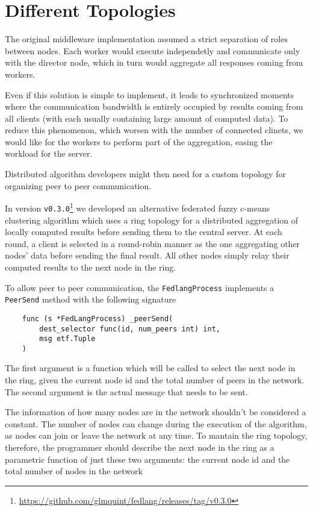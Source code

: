 \chapter{Different Topologies}

The original middleware implementation assumed a strict separation of roles between nodes. Each worker would execute independetly and communicate only with the director node, which in turn would aggregate all responses coming from workers.

Even if this solution is simple to implement, it leads to synchronized moments where the communication bandwidth is entirely occupied by results coming from all clients (with each usually containing large amount of computed data). To reduce this phenomenon, which worsen with the number of connected clinets, we would like for the workers to perform part of the aggregation, easing the workload for the server. 

Distributed algorithm developers might then need for a custom topology for organizing peer to peer communication.

In version \texttt{v0.3.0}\footnote{\url{https://github.com/glmquint/fedlang/releases/tag/v0.3.0}} we developed an alternative federated fuzzy c-means clustering algorithm which uses a ring topology for a distributed aggregation of locally computed results before sending them to the central server. At each round, a client is selected in a round-robin manner as the one aggregating other nodes' data before sending the final result. All other nodes simply relay their computed results to the next node in the ring.

To allow peer to peer communication, the \texttt{FedlangProcess} implements a \texttt{PeerSend} method with the following signature

\begin{verbatim}
	func (s *FedLangProcess) _peerSend(
		dest_selector func(id, num_peers int) int, 
		msg etf.Tuple
	)
\end{verbatim}

The first argument is a function which will be called to select the next node in the ring, given the current node id and the total number of peers in the network. The second argument is the actual message that needs to be sent.

The information of how many nodes are in the network shouldn't be considered a constant. The number of nodes can change during the execution of the algorithm, as nodes can join or leave the network at any time. To mantain the ring topology, therefore, the programmer should describe the next node in the ring as a parametric function of just these two arguments: the current node id and the total number of nodes in the network

